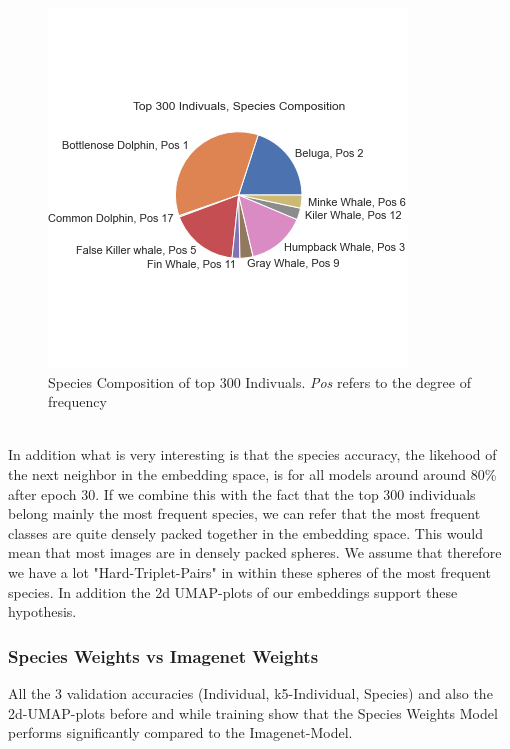 \begin{figure}[ht] 
        \centering \includegraphics[width=1\columnwidth]{figures/compo.png}
        \caption{\label{fig:compo} Species Composition of top 300 Indivuals. \textit{Pos} refers to the degree of frequency}
\end{figure}\\
In addition what is very interesting is that the species accuracy, the likehood of the next neighbor in the embedding space, is for all models around around 80\% after epoch 30. If we combine this with the fact that the top 300 individuals belong mainly the most frequent species, we can refer that the most frequent classes are quite densely packed together in the embedding space. This would mean that most images are in densely packed spheres. We assume that therefore we have a lot "Hard-Triplet-Pairs" in within these spheres of the most frequent species. In addition the 2d UMAP-plots of our embeddings support these hypothesis.

\subsubsection{Species Weights vs Imagenet Weights}
All the 3 validation accuracies (Individual, k5-Individual, Species) and also the 2d-UMAP-plots before and while training show that the Species Weights Model performs significantly compared to the Imagenet-Model.


